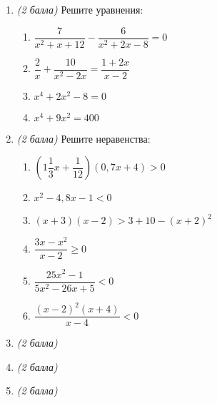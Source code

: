 \documentclass[12pt, a4paper]{article}
\begin{document}
	
	
	\begin{enumerate}
		\item \textit{(2 балла)} Решите уравнения:
		\begin{multicols}{2}
			\begin{enumerate}[label=\asbuk*)]
				\item $\dfrac{7}{x^2+x+12}-\dfrac{6}{x^2+2x-8}=0$
				\item $\dfrac{2}{x}+\dfrac{10}{x^2-2x}=\dfrac{1+2x}{x-2}$
				\item $x^4+2x^2-8=0$
				\item $x^4+9x^2=400$
			\end{enumerate}
		\end{multicols}
		\item \textit{(2 балла)} Решите неравенства:
		\begin{multicols}{2}
			\begin{enumerate}[label=\asbuk*)]
				\item $\left(1\dfrac{1}{3}x+\dfrac{1}{12} \right)(0,7x+4)>0 $
				\item $x^2-4,8x-1<0$
				\item $(x+3)(x-2)>3+10-(x+2)^2$
				\item $\dfrac{3x-x^2}{x-2}\geqslant0$
				\item $\dfrac{25x^2-1}{5x^2-26x+5}<0$
				\item $\dfrac{(x-2)^2(x+4)}{x-4}<0$
			\end{enumerate}
		\end{multicols}
		\item \textit{(2 балла)} 
		\item \textit{(2 балла)} 
		\item \textit{(2 балла)} 
	\end{enumerate}
\end{document}
